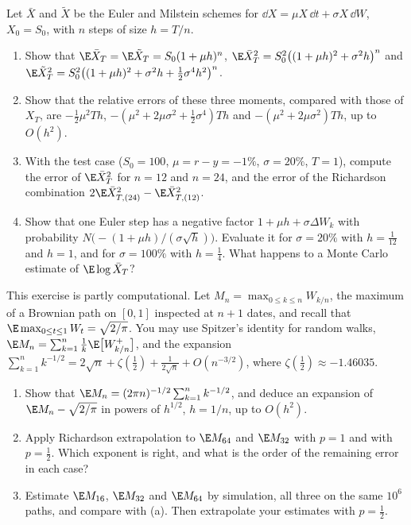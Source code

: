 \begin{exercise}\label{ex:ps-euler-moments}
\medium Let $\bar X$ and $\tilde X$ be the Euler and Milstein schemes for
$\dd X=\mu X\,\dd t+\sigma X\,\dd W$, $X_0=S_0$, with $n$ steps of size $h=T/n$.
\begin{enumerate}[label=(\alph*)]
  \item Show that $\E\bar X_T=\E\tilde X_T=S_0(1+\mu h)^n$,
    $\E\bar X_T^2=S_0^2\big((1+\mu h)^2+\sigma^2h\big)^n$ and
    $\E\tilde X_T^2=S_0^2\big((1+\mu h)^2+\sigma^2h+\frac12\sigma^4h^2\big)^n$.
  \item Show that the relative errors of these three moments, compared with those of $X_T$,
    are $-\frac12\mu^2Th$, $-(\mu^2+2\mu\sigma^2+\frac12\sigma^4)Th$ and
    $-(\mu^2+2\mu\sigma^2)Th$, up to $O(h^2)$.
  \item With the test case ($S_0=100$, $\mu=r-y=-1\%$, $\sigma=20\%$, $T=1$), compute the
    error of $\E\bar X_T^2$ for $n=12$ and $n=24$, and the error of the Richardson combination
    $2\E\bar X^2_{T,(24)}-\E\bar X^2_{T,(12)}$.
  \item Show that one Euler step has a negative factor $1+\mu h+\sigma\Delta W_k$ with
    probability $N\big(-(1+\mu h)/(\sigma\sqrt h)\big)$. Evaluate it for $\sigma=20\%$ with
    $h=\frac1{12}$ and $h=1$, and for $\sigma=100\%$ with $h=\frac14$. What happens to a Monte
    Carlo estimate of $\E\log\bar X_T$?
\end{enumerate}
\end{exercise}

\begin{exercise}\label{ex:ps-richardson-sqrt}
\medium This exercise is partly computational. Let $M_n=\max_{0\le k\le n}W_{k/n}$, the
maximum of a Brownian path on $[0,1]$ inspected at $n+1$ dates, and recall that
$\E\max_{0\le t\le1}W_t=\sqrt{2/\pi}$. You may use Spitzer's identity for random walks,
$\E M_n=\sum_{k=1}^n\frac1k\E\big[W_{k/n}^+\big]$, and the expansion
$\sum_{k=1}^nk^{-1/2}=2\sqrt n+\zeta(\tfrac12)+\frac1{2\sqrt n}+O(n^{-3/2})$, where
$\zeta(\frac12)\approx-1.46035$.
\begin{enumerate}[label=(\alph*)]
  \item Show that $\E M_n=(2\pi n)^{-1/2}\sum_{k=1}^nk^{-1/2}$, and deduce an expansion of
    $\E M_n-\sqrt{2/\pi}$ in powers of $h^{1/2}$, $h=1/n$, up to $O(h^2)$.
  \item Apply Richardson extrapolation  to $\E M_{64}$ and
    $\E M_{32}$ with $p=1$ and with $p=\frac12$. Which exponent is right, and what is the
    order of the remaining error in each case?
  \item Estimate $\E M_{16}$, $\E M_{32}$ and $\E M_{64}$ by simulation, all three on the same
    $10^6$ paths, and compare with (a). Then extrapolate your estimates with $p=\frac12$.
\end{enumerate}
\end{exercise}

